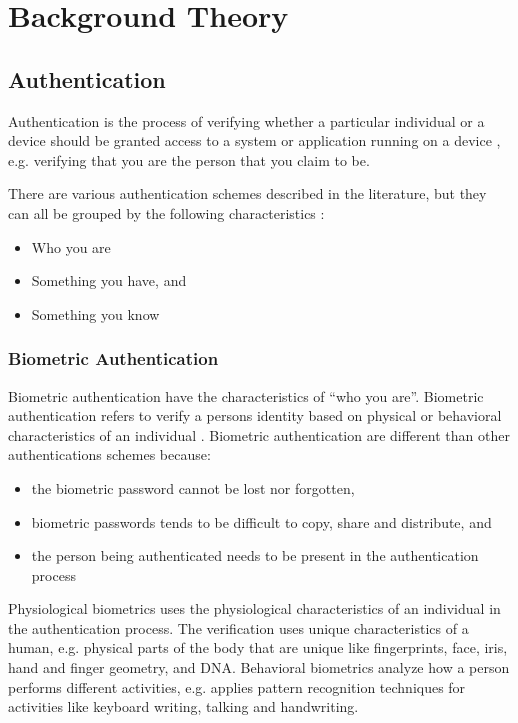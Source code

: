 \chapter{Background Theory}

  \section{Authentication}

  Authentication is the process of verifying whether a particular individual or a device should be granted access to a system or application running on a device \cite{IPAS}, e.g. verifying that you are the person that you claim to be.

  There are various authentication schemes described in the literature, but they can all be grouped by the following characteristics \cite{IPAS}:

    \begin{itemize}
      \item Who you are
      \item Something you have, and
      \item Something you know
    \end{itemize}

    \subsection{Biometric Authentication}
    Biometric authentication have the characteristics of ``who you are''. Biometric authentication refers to verify a persons identity based on physical or behavioral characteristics of an individual \cite{biometrics, biometrics2}. Biometric authentication are different than other authentications schemes because:

      \begin{itemize}
        \item the biometric password cannot be lost nor forgotten,
        \item biometric passwords tends to be difficult to copy, share and distribute, and 
        \item the person being authenticated needs to be present in the authentication process
      \end{itemize} 

     Physiological biometrics uses the physiological characteristics of an individual in the authentication process. The verification uses unique characteristics of a human, e.g. physical parts of the body that are unique like fingerprints, face, iris, hand and finger geometry, and DNA. Behavioral biometrics analyze how a person performs different activities, e.g. applies pattern recognition techniques for activities like keyboard writing, talking and handwriting.

